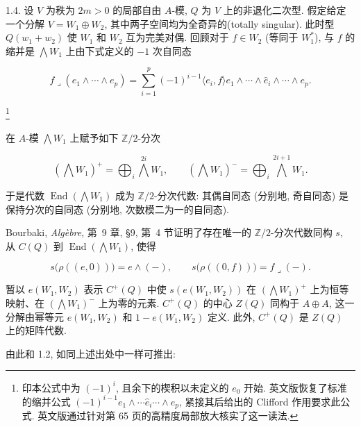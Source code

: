 1.4. 设 $V$ 为秩为 $2m>0$ 的局部自由 $A$-模, $Q$ 为 $V$ 上的非退化二次型. 假定给定一个分解 $V=W_1\oplus W_2$, 其中两子空间均为全奇异的(totally singular). 此时型 $Q(w_1+w_2)$ 使 $W_1$ 和 $W_2$ 互为完美对偶. 回顾对于 $f\in W_2$ (等同于 $W_1^*$), 与 $f$ 的缩并是 $\bigwedge W_1$ 上由下式定义的 $-1$ 次自同态

\begin{equation*}
f\mathbin{\lrcorner}(e_1\wedge\cdots\wedge e_p)
=\sum_{i=1}^{p}(-1)^{i-1}\langle e_i,f\rangle
e_1\wedge\cdots\wedge\widehat e_i\wedge\cdots\wedge e_p.
\end{equation*}

\footnote{印本公式中为 $(-1)^i$, 且余下的楔积以未定义的 $e_0$ 开始. 英文版恢复了标准的缩并公式 $(-1)^{i-1}e_1\wedge\cdots\widehat e_i\cdots\wedge e_p$, 紧接其后给出的 Clifford 作用要求此公式. 英文版通过针对第 65 页的高精度局部放大核实了这一读法.}

在 $A$-模 $\bigwedge W_1$ 上赋予如下 $\mathbb Z/2$-分次


\begin{equation*}
(\bigwedge W_1)^+=\bigoplus_i\bigwedge^{2i}W_1,
\qquad
(\bigwedge W_1)^-=\bigoplus_i\bigwedge^{2i+1}W_1.
\end{equation*}

于是代数 $\operatorname{End}(\bigwedge W_1)$ 成为 $\mathbb Z/2$-分次代数: 其偶自同态 (分别地, 奇自同态) 是保持分次的自同态 (分别地, 次数模二为一的自同态).

Bourbaki, \emph{Algèbre}, 第~9 章, \S9, 第~4 节证明了存在唯一的 $\mathbb Z/2$-分次代数同构 $s$, 从 $C(Q)$ 到 $\operatorname{End}(\bigwedge W_1)$, 使得

\begin{equation*}
s\bigl(\rho((e,0))\bigr)=e\wedge(-),
\qquad
s\bigl(\rho((0,f))\bigr)=f\mathbin{\lrcorner}(-).
\end{equation*}

暂以 $e(W_1,W_2)$ 表示 $C^+(Q)$ 中使 $s(e(W_1,W_2))$ 在 $(\bigwedge W_1)^+$ 上为恒等映射、在 $(\bigwedge W_1)^-$ 上为零的元素. $C^+(Q)$ 的中心 $Z(Q)$ 同构于 $A\oplus A$, 这一分解由幂等元 $e(W_1,W_2)$ 和 $1-e(W_1,W_2)$ 定义. 此外, $C^+(Q)$ 是 $Z(Q)$ 上的矩阵代数.

由此和 1.2, 如同上述出处中一样可推出:

